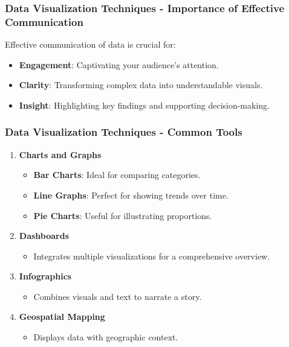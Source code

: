 \documentclass{beamer}
\begin{document}
\begin{frame}[fragile]
    \frametitle{Data Visualization Techniques - Importance of Effective Communication}
    Effective communication of data is crucial for:
    \begin{itemize}
        \item \textbf{Engagement}: Captivating your audience's attention.
        \item \textbf{Clarity}: Transforming complex data into understandable visuals.
        \item \textbf{Insight}: Highlighting key findings and supporting decision-making.
    \end{itemize}
\end{frame}

\begin{frame}[fragile]
    \frametitle{Data Visualization Techniques - Common Tools}
    \begin{enumerate}
        \item \textbf{Charts and Graphs}
            \begin{itemize}
                \item \textbf{Bar Charts}: Ideal for comparing categories.
                \item \textbf{Line Graphs}: Perfect for showing trends over time.
                \item \textbf{Pie Charts}: Useful for illustrating proportions.
            \end{itemize}

        \item \textbf{Dashboards}
            \begin{itemize}
                \item Integrates multiple visualizations for a comprehensive overview.
            \end{itemize}

        \item \textbf{Infographics}
            \begin{itemize}
                \item Combines visuals and text to narrate a story.
            \end{itemize}

        \item \textbf{Geospatial Mapping}
            \begin{itemize}
                \item Displays data with geographic context.
            \end{itemize}
    \end{enumerate}
\end{frame}
\end{document}
